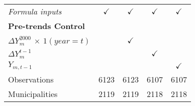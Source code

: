 \begin{tabular}{lcccc}
\textit{Formula inputs}  	& 	$\checkmark$    &   
								$\checkmark$    & 
								$\checkmark$    & 
								$\checkmark$    \\


{\bf Pre-trends Control}       &	   &   
									   & 
									   &
									   \\

\textit{$\Delta Y^{2000}_m$ $\times$ $1(year=t)$}  & 	
												   & $\checkmark$	
												   & 
												   & \\


\textit{$\Delta Y^{t-1}_m$} 						&	
													&   
													& $\checkmark$	
													& \\

\textit{$Y_{m,t-1}$}  								&
													& 
													& 
													& $\checkmark$	\\

\midrule		


Observations 			&	 6123   &   
							 6123   & 
							 6107   & 
							 6107   \\

Municipalities  		&    2119   &   
							 2119   & 
							 2118   & 
							 2118   \\


\bottomrule

\end{tabular}%
